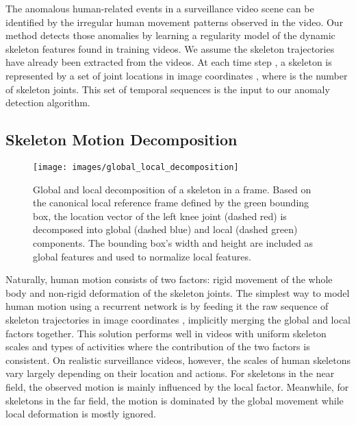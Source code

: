 The anomalous human-related events in a surveillance video scene can
be identified by the irregular human movement patterns observed in
the video. Our method detects those anomalies by learning a regularity
model of the dynamic skeleton features found in training videos. We
assume the skeleton trajectories have already been extracted from
the videos. At each time step , a skeleton is represented by a
set of joint locations in image coordinates ,
where  is the number of skeleton joints. This set of temporal
sequences is the input to our anomaly detection algorithm.

\subsection{Skeleton Motion Decomposition\label{subsec:Skeleton-Motion-Decomposition}}

\begin{figure}[h]
\begin{centering}
\texttt{[image: images/global\_local\_decomposition]}
\par\end{centering}
\caption{Global and local decomposition of a skeleton in a frame. Based on
the canonical local reference frame defined by the green bounding
box, the location vector of the left knee joint (dashed red)
is decomposed into global (dashed blue) and local 
(dashed green) components. The bounding box's width and height are
included as global features and used to normalize local features.}

\label{fig:global_local_decomposition}
\end{figure}
Naturally, human motion consists of two factors: rigid movement of
the whole body and non-rigid deformation of the skeleton joints. The
simplest way to model human motion using a recurrent network is by
feeding it the raw sequence of skeleton trajectories in image coordinates
 \cite{fragkiadaki2015recurrent,villegas2017learning},
implicitly merging the global and local factors together. This solution
performs well in videos with uniform skeleton scales and types of
activities where the contribution of the two factors is consistent.
On realistic surveillance videos, however, the scales of human skeletons
vary largely depending on their location and actions. For skeletons
in the near field, the observed motion is mainly influenced by the
local factor. Meanwhile, for skeletons in the far field, the motion
is dominated by the global movement while local deformation is mostly
ignored. 

